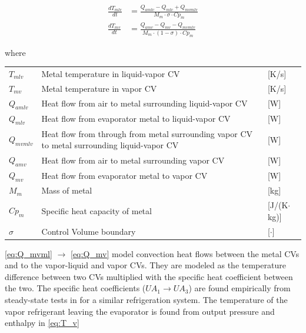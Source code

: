 \begin{align}
	\frac{dT_{mlv}}{dt} & = \frac{Q_{amlv}-Q_{mlv} + Q_{mvmlv}}{M_m \cdot \sigma \cdot Cp_m}        \label{eq:evap_dT_ml} \\
	\frac{dT_{mv}}{dt} & = \frac{Q_{amv} - Q_{mv} - Q_{mvmlv}}{M_m \cdot (1 - \sigma) \cdot Cp_m } \label{eq:evap_dT_mv}
\end{align}

where

\begin{center}
	\begin{tabular}{l p{10cm} l}
		$T_{mlv} $  & Metal temperature in liquid-vapor CV                                                        & [\si{K}/\si{s}]                   \\ %
		$T_{mv} $   & Metal temperature in vapor CV                                                               & [\si{K}/\si{s}]                   \\ %
		$Q_{amlv}$  & Heat flow from air to metal surrounding liquid-vapor CV                                     & [\si{W}]                          \\
		$Q_{mlv}$   & Heat flow from evaporator metal to liquid-vapor CV                                          & [\si{W}]                          \\
		$Q_{mvmlv}$ & Heat flow from through from metal surrounding vapor CV to metal surrounding liquid-vapor CV & [\si{W}]                          \\
		$Q_{amv}$   & Heat flow from air to metal surrounding vapor CV                                            & [\si{W}]                          \\
		$Q_{mv}$    & Heat flow from evaporator metal to vapor CV                                                 & [\si{W}]                          \\
		$M_{m} $    & Mass of metal                                                                               & [\si{kg}]                         \\
		$Cp_{m}$    & Specific heat capacity of metal                                                             & [\si{J}/(\si{K}$ \cdot $\si{kg})] \\
		$\sigma$    & Control Volume boundary                                                                     & [$\cdot$]
	\end{tabular}
\end{center}

\medskip
\cref{eq:Q_mvml} $\rightarrow$ \cref{eq:Q_mv} model convection heat flows between the metal CVs and to the vapor-liquid and vapor CVs. They are modeled as the temperature difference between two CVs multiplied with the specific heat coefficient between the two. The specific heat coefficients ($U A_1 \rightarrow U A_3$) are found empirically from steady-state tests in \cite{Sorensen2013} for a similar refrigeration system. The temperature of the vapor refrigerant leaving the evaporator is found from output pressure and enthalpy in \cref{eq:T_v}

